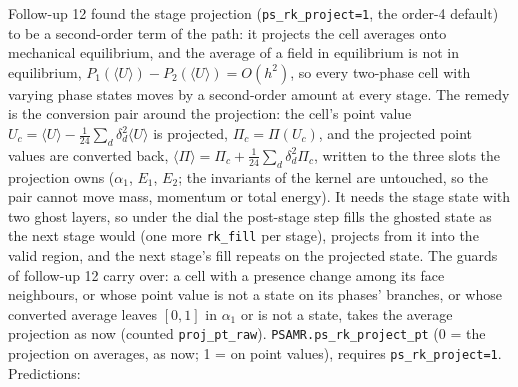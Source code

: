 \documentclass[11pt,a4paper]{article}
\newcommand{\code}[1]{\texttt{\small #1}}
\begin{document}
Follow-up 12 found the stage projection (\code{ps\_rk\_project=1}, the
order-4 default) to be a second-order term of the path: it projects the
cell averages onto mechanical equilibrium, and the average of a field in
equilibrium is not in equilibrium, $P_1(\langle U\rangle) -
P_2(\langle U\rangle) = O(h^2)$, so every two-phase cell with varying
phase states moves by a second-order amount at every stage.  The remedy
is the conversion pair around the projection: the cell's point value
$U_c = \langle U\rangle - \tfrac{1}{24}\sum_d\delta^2_d\langle U\rangle$
is projected, $\Pi_c = \Pi(U_c)$, and the projected point values are
converted back, $\langle\Pi\rangle = \Pi_c + \tfrac{1}{24}\sum_d
\delta^2_d\Pi_c$, written to the three slots the projection owns
($\alpha_1$, $E_1$, $E_2$; the invariants of the kernel are untouched,
so the pair cannot move mass, momentum or total energy).  It needs the
stage state with two ghost layers, so under the dial the post-stage
step fills the ghosted state as the next stage would (one more
\code{rk\_fill} per stage), projects from it into the valid region, and
the next stage's fill repeats on the projected state.  The guards of
follow-up 12 carry over: a cell with a presence change among its face
neighbours, or whose point value is not a state on its phases' branches,
or whose converted average leaves $[0,1]$ in $\alpha_1$ or is not a state,
takes the average projection as now (counted \code{proj\_pt\_raw}).
\code{PSAMR.ps\_rk\_project\_pt} (0 = the projection on averages, as
now; 1 = on point values), requires \code{ps\_rk\_project=1}.
Predictions:
\end{document}
